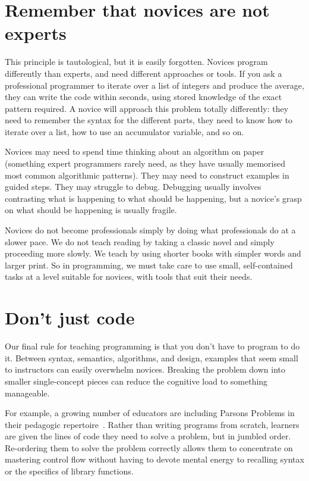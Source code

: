 \documentclass{article}
\begin{document}
\section{Remember that novices are not experts}\label{not-experts}

This principle is tautological, but it is easily forgotten.
Novices program differently than experts,
and need different approaches or tools.
If you ask a professional programmer to iterate over a list of integers and produce the average,
they can write the code within seconds,
using stored knowledge of the exact pattern required.
A novice will approach this problem totally differently:
they need to remember the syntax for the different parts,
they need to know how to iterate over a list,
how to use an accumulator variable,
and so on.

Novices may need to spend time thinking about an algorithm on paper
(something expert programmers rarely need,
as they have usually memorised most common algorithmic patterns).
They may need to construct examples in guided steps.
They may struggle to debug.
Debugging usually involves contrasting what is happening to what should be happening,
but a novice's grasp on what should be happening is usually fragile.

Novices do not become professionals simply by doing what professionals do at a slower pace.
We do not teach reading by taking a classic novel and simply proceeding more slowly.
We teach by using shorter books with simpler words and larger print.
So in programming,
we must take care to use small, self-contained tasks at a level suitable for novices,
with tools that suit their needs.

\section{Don't just code}\label{not-just-code}

Our final rule for teaching programming is that you don't have to program to do it.
Between syntax, semantics, algorithms, and design,
examples that seem small to instructors can easily overwhelm novices.
Breaking the problem down into smaller single-concept pieces
can reduce the cognitive load to something manageable.

For example,
a growing number of educators are including Parsons Problems
in their pedagogic repertoire~\citep{parsons,morrison-parsons}.
Rather than writing programs from scratch,
learners are given the lines of code they need to solve a problem,
but in jumbled order.
Re-ordering them to solve the problem correctly
allows them to concentrate on mastering control flow
without having to devote mental energy to recalling syntax
or the specifics of library functions.
\end{document}
